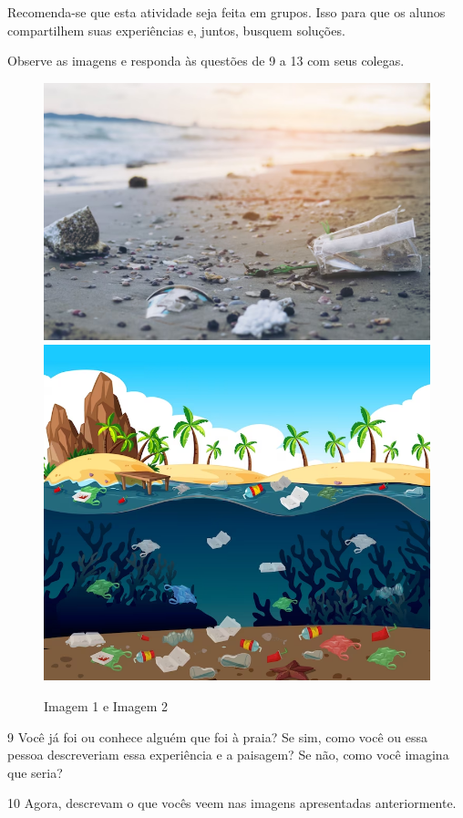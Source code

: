 \begin{itemize}
\begin{itemize}
{Recomenda-se que esta atividade seja feita em grupos. Isso para que os
alunos compartilhem suas experiências e, juntos, busquem soluções.}

Observe as imagens e responda às questões de 9 a 13 com seus colegas.

\begin{figure}[htpb!]
\includegraphics[width=.5\textwidth]{./imgs/img35.png}
\includegraphics[width=.5\textwidth]{./imgs/img36.png}
\caption{Imagem 1 e Imagem 2}
\end{figure}



\num{9} Você já foi ou conhece alguém que foi à praia? Se sim, como você ou essa
pessoa descreveriam essa experiência e a paisagem? Se não, como você
imagina que seria?


\num{10} Agora, descrevam o que vocês veem nas imagens apresentadas anteriormente.


\end{itemize}
\end{itemize}
